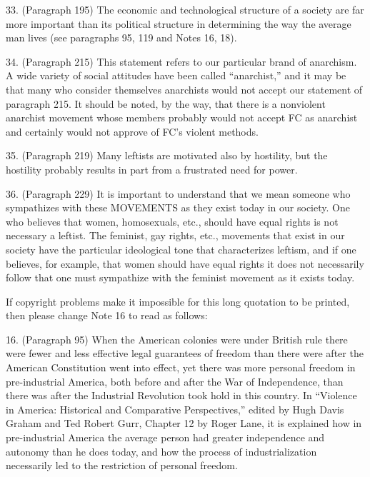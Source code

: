 33. (Paragraph 195) The economic and technological structure of a society are far more important than its political structure in determining the way the average man lives (see paragraphs 95, 119 and Notes 16, 18).

34. (Paragraph 215) This statement refers to our particular brand of anarchism. A wide variety of social attitudes have been called “anarchist,” and it may be that many who consider themselves anarchists would not accept our statement of paragraph 215. It should be noted, by the way, that there is a nonviolent anarchist movement whose members probably would not accept FC as anarchist and certainly would not approve of FC’s violent methods.

35. (Paragraph 219) Many leftists are motivated also by hostility, but the hostility probably results in part from a frustrated need for power.

36. (Paragraph 229) It is important to understand that we mean someone who sympathizes with these MOVEMENTS as they exist today in our society. One who believes that women, homosexuals, etc., should have equal rights is not necessary a leftist. The feminist, gay rights, etc., movements that exist in our society have the particular ideological tone that characterizes leftism, and if one believes, for example, that women should have equal rights it does not necessarily follow that one must sympathize with the feminist movement as it exists today.

If copyright problems make it impossible for this long quotation to be printed, then please change Note 16 to read as follows:

16. (Paragraph 95) When the American colonies were under British rule there were fewer and less effective legal guarantees of freedom than there were after the American Constitution went into effect, yet there was more personal freedom in pre-industrial America, both before and after the War of Independence, than there was after the Industrial Revolution took hold in this country. In “Violence in America: Historical and Comparative Perspectives,” edited by Hugh Davis Graham and Ted Robert Gurr, Chapter 12 by Roger Lane, it is explained how in pre-industrial America the average person had greater independence and autonomy than he does today, and how the process of industrialization necessarily led to the restriction of personal freedom.

